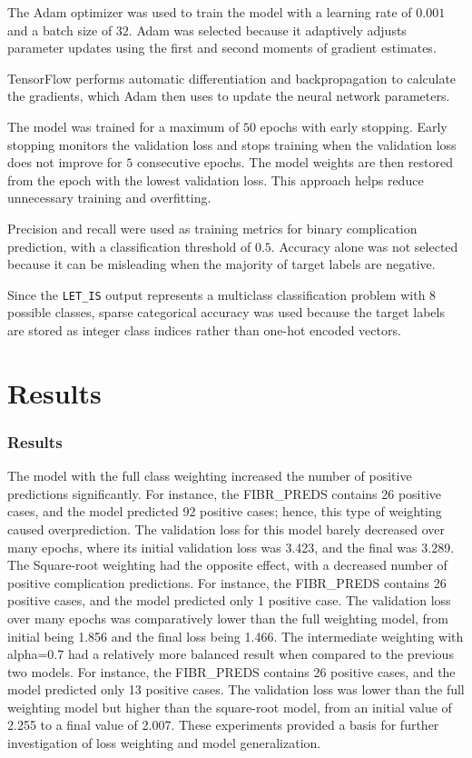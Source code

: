\documentclass[11pt]{article}
\begin{document}
The Adam optimizer was used to train the model with a learning rate of $0.001$ and a batch size of $32$. Adam was selected because it adaptively adjusts parameter updates using the first and second moments of gradient estimates.

TensorFlow performs automatic differentiation and backpropagation to calculate the gradients, which Adam then uses to update the neural network parameters.

The model was trained for a maximum of $50$ epochs with early stopping. Early stopping monitors the validation loss and stops training when the validation loss does not improve for $5$ consecutive epochs. The model weights are then restored from the epoch with the lowest validation loss. This approach helps reduce unnecessary training and overfitting.

Precision and recall were used as training metrics for binary complication prediction, with a classification threshold of $0.5$. Accuracy alone was not selected because it can be misleading when the majority of target labels are negative.

Since the \texttt{LET\_IS} output represents a multiclass classification problem with $8$ possible classes, sparse categorical accuracy was used because the target labels are stored as integer class indices rather than one-hot encoded vectors.

\section{Results}

\subsubsection{Results}

The model with the full class weighting increased the number of positive predictions significantly. For instance, the FIBR\_PREDS contains 26 positive cases, and the model predicted 92 positive cases; hence, this type of weighting caused overprediction. The validation loss for this model barely decreased over many epochs, where its initial validation loss was 3.423, and the final was 3.289. The Square-root weighting had the opposite effect, with a decreased number of positive complication predictions. For instance, the FIBR\_PREDS contains 26 positive cases, and the model predicted only 1 positive case. The validation loss over many epochs was comparatively lower than the full weighting model, from initial being 1.856 and the final loss being 1.466. The intermediate weighting with alpha=0.7 had a relatively more balanced result when compared to the previous two models. For instance, the FIBR\_PREDS contains 26 positive cases, and the model predicted only 13 positive cases. The validation loss was lower than the full weighting model but higher than the square-root model, from an initial value of 2.255 to a final value of 2.007. These experiments provided a basis for further investigation of loss weighting and model generalization.
\end{document}
